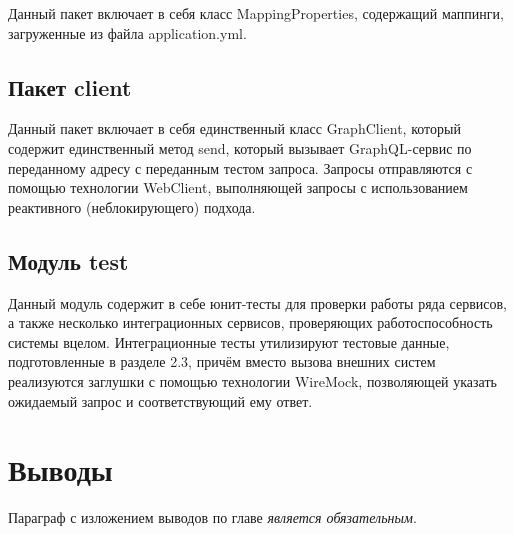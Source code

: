 Данный пакет включает в себя класс MappingProperties, содержащий маппинги, загруженные из файла application.yml.

\subsection{Пакет client}

Данный пакет включает в себя единственный класс GraphClient, который содержит единственный метод send, который вызывает GraphQL-сервис по переданному адресу с переданным тестом запроса.
Запросы отправляются с помощью технологии WebClient, выполняющей запросы с использованием реактивного (неблокирующего) подхода.

\subsection{Модуль test}

Данный модуль содержит в себе юнит-тесты для проверки работы ряда сервисов, а также несколько интеграционных сервисов, проверяющих работоспособность системы вцелом.
Интеграционные тесты утилизируют тестовые данные, подготовленные в разделе 2.3, причём вместо вызова внешних систем реализуются заглушки с помощью технологии WireMock, позволяющей указать ожидаемый запрос и соответствующий ему ответ.


\section{Выводы} \label{sec:ch3-conclusion}

Параграф с изложением выводов по главе \textit{является обязательным}.